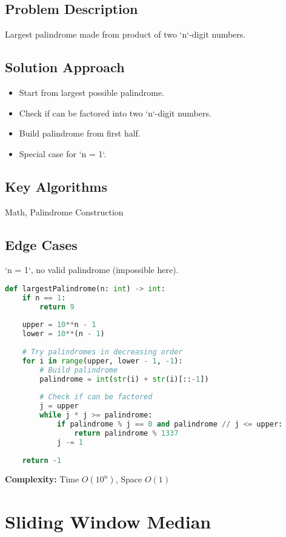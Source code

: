 \documentclass[10pt, a4paper]{article}
\begin{document}
\subsection*{Problem Description}
Largest palindrome made from product of two `n`-digit numbers.

\subsection*{Solution Approach}
\begin{itemize}
    \item Start from largest possible palindrome.
    \item Check if can be factored into two `n`-digit numbers.
    \item Build palindrome from first half.
    \item Special case for `n = 1`.
\end{itemize}

\subsection*{Key Algorithms}
Math, Palindrome Construction

\subsection*{Edge Cases}
`n = 1`, no valid palindrome (impossible here).

\begin{lstlisting}[language=Python]
def largestPalindrome(n: int) -> int:
    if n == 1:
        return 9
    
    upper = 10**n - 1
    lower = 10**(n - 1)
    
    # Try palindromes in decreasing order
    for i in range(upper, lower - 1, -1):
        # Build palindrome
        palindrome = int(str(i) + str(i)[::-1])
        
        # Check if can be factored
        j = upper
        while j * j >= palindrome:
            if palindrome % j == 0 and palindrome // j <= upper:
                return palindrome % 1337
            j -= 1
    
    return -1
\end{lstlisting}
\textbf{Complexity:} Time $O(10^n)$, Space $O(1)$

\section{Sliding Window Median}
\end{document}

